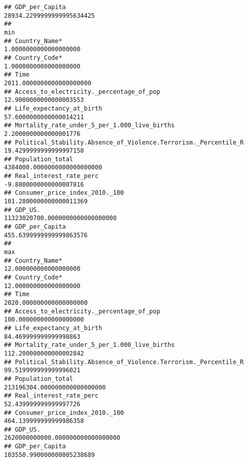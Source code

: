 \documentclass[
]{article}
\begin{document}
\begin{verbatim}
## GDP_per_Capita                                                         28934.2299999999995634425
##                                                                                             min
## Country_Name*                                                             1.0000000000000000000
## Country_Code*                                                             1.0000000000000000000
## Time                                                                   2011.0000000000000000000
## Access_to_electricity._percentage_of_pop                                 12.9000000000000003553
## Life_expectancy_at_birth                                                 57.6000000000000014211
## Mortality_rate_under_5_per_1.000_live_births                              2.2000000000000001776
## Political_Stability.Absence_of_Violence.Terrorism._Percentile_R          19.4299999999999997158
## Population_total                                                    4384000.0000000000000000000
## Real_interest_rate_perc                                                  -9.8800000000000007816
## Consumer_price_index_2010._100                                          101.2800000000000011369
## GDP_US.                                                         11323020700.0000000000000000000
## GDP_per_Capita                                                          455.6399999999999863576
##                                                                                              max
## Country_Name*                                                              12.000000000000000000
## Country_Code*                                                              12.000000000000000000
## Time                                                                     2020.000000000000000000
## Access_to_electricity._percentage_of_pop                                  100.000000000000000000
## Life_expectancy_at_birth                                                   84.469999999999998863
## Mortality_rate_under_5_per_1.000_live_births                              112.200000000000002842
## Political_Stability.Absence_of_Violence.Terrorism._Percentile_R            99.519999999999996021
## Population_total                                                    213196304.000000000000000000
## Real_interest_rate_perc                                                    52.439999999999997726
## Consumer_price_index_2010._100                                            464.139999999999986358
## GDP_US.                                                         2620000000000.000000000000000000
## GDP_per_Capita                                                         103550.990000000005238689

\end{verbatim}
\end{document}
